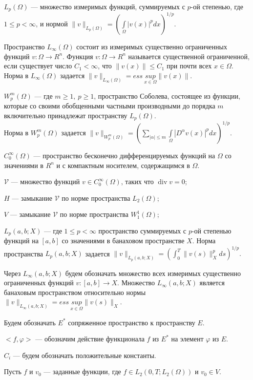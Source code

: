 $L_p(\Omega)$ --- множество измеримых функций, суммируемых с $p$-ой степенью, где $1\le p< \infty$,
и нормой $\|v\|_{L_p(\Omega)}=(\int\limits_\Omega |v(x)|^pdx)^{1/p}$.

Пространство $L_{\infty}(\Omega)$ состоит из измеримых существенно ограниченных функций $v:\Omega\rightarrow R^n$. 
Функция $v:\Omega\rightarrow R^n$ называется существенной ограниченной, если существует число $C_1<\infty$, что $\|v(x)\|\le C_1$ при почти всех $x\in\Omega$.
Норма в $L_{\infty}(\Omega)$ задается
$\|v\|_{L_{\infty}(\Omega)}=ess \ \underset{x\in\Omega}{sup} \|v(x)\|$.

$W_p^m(\Omega)$ --- где $m\geqslant 1, \ p\geqslant 1$, пространство Соболева, состоящее из
функции, которые со своими обобщенными частными производными до порядка $m$ включительно принадлежат пространству $L_p(\Omega)$.\\
Норма в $W_p^m(\Omega)$ задается $\|v\|_{W_p^m(\Omega)}=\left(\sum\limits_{|\alpha|\leqslant m} \int\limits_\Omega |D^{\alpha}v(x)|^pdx\right)^{1/p}$.

$C_0^{\infty}(\Omega)$ --- пространство бесконечно дифференцируемых функций на $\Omega$ со значениями в $R^n$ и с компактным носителем,
содержащимся в $\Omega$.

$\mathcal{V}$ --- множество функций $v\in C_0^{\infty}(\Omega)$, таких что $\operatorname{div}v=0$;

$H$ --- замыкание $\mathcal{V}$ по норме пространства $L_2(\Omega)$;

$V$ --- замыкание $\mathcal{V}$ по норме пространства $W_1^1(\Omega)$;

$L_p(a,b;X)$ --- где $1\le p< \infty$ пространство суммируемых с $p$-ой степенью функций на $[a, b]$ со значениями в
банаховом пространстве $X$. Норма пространства $L_p(a, b;X)$ задается 
$\|v\|_{L_p(a, b;X)}=(\int_0^T\|v(s)\|_X^p ds)^{1/p}.$

Через $L_{\infty}(a,b;X)$ будем обозначать множество всех измеримых существенно ограниченных функций $v:[a,b]\rightarrow X$.
Множество $L_{\infty}(a,b;X)$ является банаховым пространством относительно нормы $\|v\|_{L_{\infty}(a,b;X)}=ess \ \underset{x\in\Omega}{sup} \|v(s)\|_X$.

Будем обозначать $E^*$ сопряженное пространство к пространству $E$.

$<f,\varphi>$ --- обозначим действие функционала $f$ из $E^*$ на элемент $\varphi$ из $E$.

$C_i$ --- будем обозначать положительные константы.

Пусть $f$ и $v_0$ --- заданные функции,
где $f\in L_2(0, T; L_2(\Omega))$ и $v_0\in V$.

